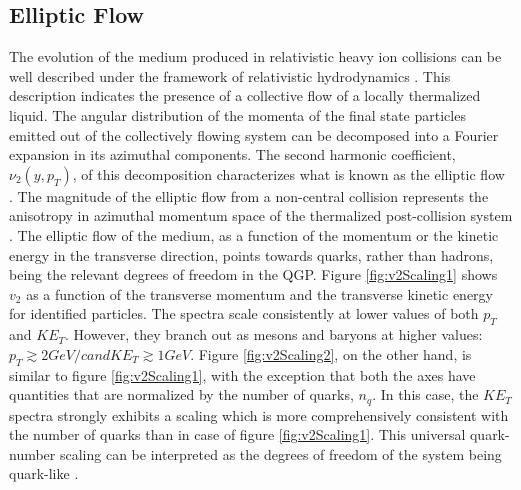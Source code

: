 \subsection{Elliptic Flow}
The evolution of the medium produced in relativistic heavy ion collisions can be well described under the framework of relativistic hydrodynamics \cite{SCHENKE2017105,2014NuPhA.926...92S}. This description indicates the presence of a collective flow of a locally thermalized liquid. The angular distribution of the momenta of the final state particles emitted out of the collectively flowing system can be decomposed into a Fourier expansion in its azimuthal components. The second harmonic coefficient, $\nu_{2}(y,p_{T})$, of this decomposition characterizes what is known as the elliptic flow \cite{2001PhLB..503...58H}. The magnitude of the elliptic flow from a non-central collision represents the anisotropy in azimuthal momentum space of the thermalized post-collision system \cite{2011NJPh...13e5008S}.
The elliptic flow of the medium, as a function of the momentum or the kinetic energy in the transverse direction, points towards quarks, rather than hadrons, being the relevant degrees of freedom in the QGP. Figure \ref{fig:v2Scaling1} shows $v_{2}$ as a function of the transverse momentum and the transverse kinetic energy for identified particles. The spectra scale consistently at lower values of both $p_{T}$ and $KE_{T}$. However, they branch out as mesons and baryons at higher values: $p_{T} \gtrsim 2 GeV/c and KE_{T} \gtrsim 1 GeV$. Figure \ref{fig:v2Scaling2}, on the other hand, is similar to figure \ref{fig:v2Scaling1}, with the exception that both the axes have quantities that are normalized by the number of quarks, $n_{q}$. In this case, the $KE_{T}$ spectra strongly exhibits a scaling which is more comprehensively consistent with the number of quarks than in case of figure \ref{fig:v2Scaling1}. This universal quark-number scaling can be interpreted as the degrees of freedom of the system being quark-like \cite{2007PhRvL..98p2301A}.
